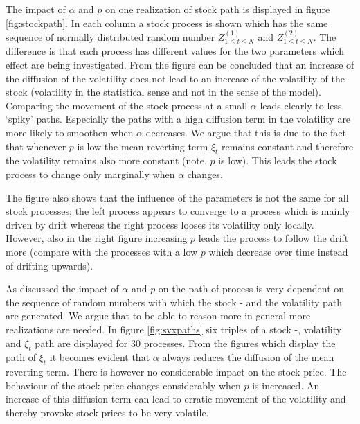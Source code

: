 \documentclass[a4paper,onecolumn]{IEEEtran}
\begin{document}
The impact of $\alpha$ and $p$ on one realization of stock path is displayed
in figure \ref{fig:stockpath}. In each column a stock process is shown which has
the same sequence of normally distributed random number $Z^{(1)}_{1\leq t\leq
N}$ and $Z^{(2)}_{1\leq t\leq N}$. The difference is that each process has
different values for the two parameters which effect are being investigated.
From the figure can be concluded that an increase of the diffusion of the
volatility does not lead to an increase of the volatility of the stock
(volatility in the statistical sense and not in the sense of the model).
Comparing the movement of the stock process at a small $\alpha$ leads clearly
to less `spiky' paths. Especially the paths with a high diffusion term in the
volatility are more likely to smoothen when $\alpha$ decreases. We argue that
this is due to the fact that whenever $p$ is low the mean reverting term
$\xi_t$ remains constant and therefore the volatility remains also more
constant (note, $p$ is low). This leads the stock process to change only
marginally when $\alpha$ changes.

The figure also shows that the influence of the parameters is not the same for
all stock processes; the left process appears to converge to a process which
is mainly driven by drift whereas the right process looses its volatility only
locally.  However, also in the right figure increasing $p$ leads the process
to follow the drift more (compare with the processes with a low $p$ which
decrease over time instead of drifting upwards).

As discussed the impact of $\alpha$ and $p$ on the path of process is very
dependent on the sequence of random numbers with which the stock - and the
volatility path are generated. We argue that to be able to reason more in
general more realizations are needed. In figure \ref{fig:svxpaths} six triples
of a stock -, volatility and $\xi_t$ path are displayed for 30 processes. From
the figures which display the path of $\xi_t$ it becomes evident that $\alpha$
always reduces the diffusion of the mean reverting term. There is however no
considerable impact on the stock price. The behaviour of the stock price
changes considerably when $p$ is increased. An increase of this diffusion term
can lead to erratic movement of the volatility and thereby provoke stock
prices to be very volatile.
\end{document}

